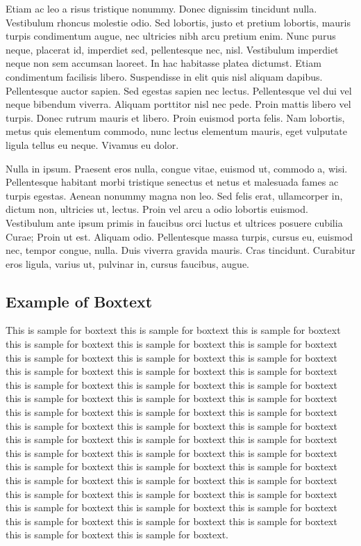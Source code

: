 \documentclass[AMA,STIX1COL]{WileyNJD-SP}
\begin{document}
Etiam ac leo a risus tristique nonummy. Donec dignissim tincidunt nulla. Vestibulum rhoncus molestie odio. Sed
lobortis, justo et pretium lobortis, mauris turpis condimentum augue, nec ultricies nibh arcu pretium enim. Nunc
purus neque, placerat id, imperdiet sed, pellentesque nec, nisl. Vestibulum imperdiet neque non sem accumsan laoreet.
In hac habitasse platea dictumst. Etiam condimentum facilisis libero. Suspendisse in elit quis nisl aliquam dapibus.
Pellentesque auctor sapien. Sed egestas sapien nec lectus. Pellentesque vel dui vel neque bibendum viverra. Aliquam
porttitor nisl nec pede. Proin mattis libero vel turpis. Donec rutrum mauris et libero. Proin euismod porta felis.
Nam lobortis, metus quis elementum commodo, nunc lectus elementum mauris, eget vulputate ligula tellus eu neque.
Vivamus eu dolor.

Nulla in ipsum. Praesent eros nulla, congue vitae, euismod ut, commodo a, wisi. Pellentesque habitant morbi
tristique senectus et netus et malesuada fames ac turpis egestas. Aenean nonummy magna non leo. Sed felis erat,
ullamcorper in, dictum non, ultricies ut, lectus. Proin vel arcu a odio lobortis euismod. Vestibulum ante ipsum primis
in faucibus orci luctus et ultrices posuere cubilia Curae; Proin ut est. Aliquam odio. Pellentesque massa turpis, cursus
eu, euismod nec, tempor congue, nulla. Duis viverra gravida mauris. Cras tincidunt. Curabitur eros ligula, varius ut,
pulvinar in, cursus faucibus, augue.



\begin{boxtext}
\section*{Example of Boxtext}%
This is sample for boxtext this is sample for boxtext this is sample for boxtext this is sample for boxtext this is sample for boxtext this is sample for boxtext this is sample for boxtext this is sample for boxtext this is sample for boxtext this is sample for boxtext this is sample for boxtext this is sample for boxtext this is sample for boxtext this is sample for boxtext this is sample for boxtext this is sample for boxtext this is sample for boxtext this is sample for boxtext this is sample for boxtext this is sample for boxtext this is sample for boxtext this is sample for boxtext this is sample for boxtext this is sample for boxtext this is sample for boxtext this is sample for boxtext this is sample for boxtext this is sample for boxtext this is sample for boxtext this is sample for boxtext this is sample for boxtext this is sample for boxtext this is sample for boxtext this is sample for boxtext this is sample for boxtext this is sample for boxtext this is sample for boxtext this is sample for boxtext this is sample for boxtext this is sample for boxtext this is sample for boxtext this is sample for boxtext this is sample for boxtext this is sample for boxtext this is sample for boxtext this is sample for boxtext this is sample for boxtext.
\end{boxtext}
\end{document}
